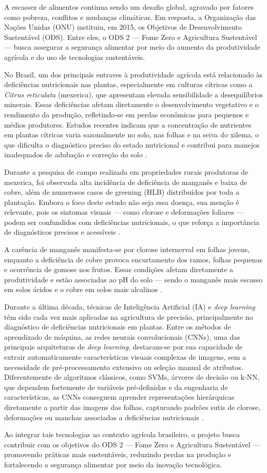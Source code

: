 A escassez de alimentos continua sendo um desafio global, agravado por fatores como pobreza, conflitos e mudanças climáticas. Em resposta, a Organização das Nações Unidas (ONU) instituiu, em 2015, os Objetivos de Desenvolvimento Sustentável (ODS). Entre eles, o ODS 2 — Fome Zero e Agricultura Sustentável — busca assegurar a segurança alimentar por meio do aumento da produtividade agrícola e do uso de tecnologias sustentáveis.

No Brasil, um dos principais entraves à produtividade agrícola está relacionado às deficiências nutricionais nas plantas, especialmente em culturas cítricas como a \textit{Citrus reticulata} (mexerica), que apresentam elevada sensibilidade a desequilíbrios minerais. Essas deficiências afetam diretamente o desenvolvimento vegetativo e o rendimento da produção, refletindo-se em perdas econômicas para pequenos e médios produtores. Estudos recentes indicam que a concentração de nutrientes em plantas cítricas varia sazonalmente no solo, nas folhas e na seiva do xilema, o que dificulta o diagnóstico preciso do estado nutricional e contribui para manejos inadequados de adubação e correção do solo \cite{FaveroFilho2022}. 

Durante a pesquisa de campo realizada em propriedades rurais produtoras de mexerica, foi observada alta incidência de deficiência de manganês e baixa de cobre, além de numerosos casos de greening (HLB) distribuídos por toda a plantação. Embora o foco deste estudo não seja essa doença, sua menção é relevante, pois os sintomas visuais — como clorose e deformações foliares — podem ser confundidos com deficiências nutricionais, o que reforça a importância de diagnósticos precisos e acessíveis \cite{Fundecitrus2021, Aregbe2024}.

A carência de manganês manifesta-se por clorose internerval em folhas jovens, enquanto a deficiência de cobre provoca encurtamento dos ramos, folhas pequenas e ocorrência de gomose nos frutos. Essas condições afetam diretamente a produtividade e estão associadas ao pH do solo — sendo o manganês mais escasso em solos ácidos e o cobre em solos mais alcalinos \cite{Bruna2019, Machado2022}.

Durante a última década, técnicas de Inteligência Artificial (IA) e \textit{deep learning} têm sido cada vez mais aplicadas na agricultura de precisão, principalmente no diagnóstico de deficiências nutricionais em plantas. Entre os métodos de aprendizado de máquina, as redes neurais convolucionais (CNNs), uma das principais arquiteturas de \textit{deep learning}, destacam-se por sua capacidade de extrair automaticamente características visuais complexas de imagens, sem a necessidade de pré-processamento extensivo ou seleção manual de atributos. Diferentemente de algoritmos clássicos, como SVMs, árvores de decisão ou k‑NN, que dependem fortemente de variáveis pré-definidas e da engenharia de características, as CNNs conseguem aprender representações hierárquicas diretamente a partir das imagens das folhas, capturando padrões sutis de clorose, deformações ou manchas associadas a deficiências nutricionais \cite{Qin2018, Christin2019}.

Ao integrar tais tecnologias ao contexto agrícola brasileiro, o projeto busca contribuir com os objetivos do ODS 2 — Fome Zero e Agricultura Sustentável — promovendo práticas mais sustentáveis, reduzindo perdas na produção e fortalecendo a segurança alimentar por meio da inovação tecnológica.